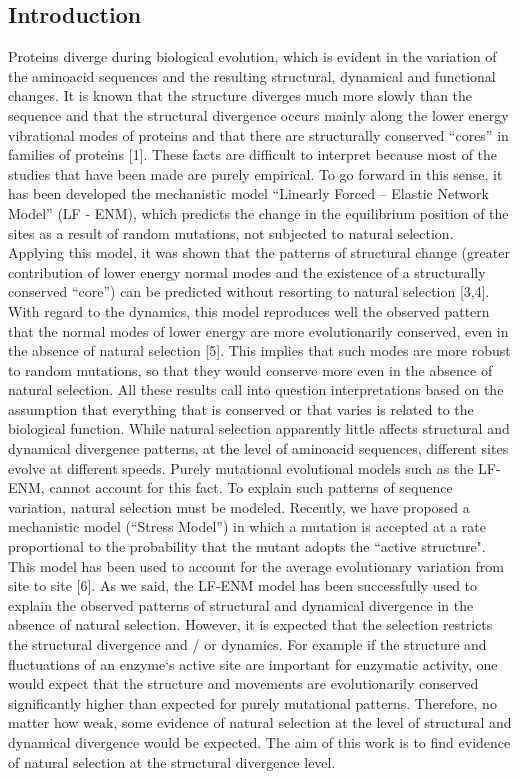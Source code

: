 \documentclass{article}
\begin{document}
\begin{multicols}{2} 
\section{Introduction}
Proteins diverge during biological evolution, which is evident in the variation of the aminoacid sequences and the resulting structural, dynamical and functional changes. It is known that the structure diverges much more slowly than the sequence and that the  structural divergence occurs mainly along the lower energy vibrational modes of proteins and that there are structurally conserved ``cores'' in families of proteins [1]. These facts are difficult to interpret because most of the studies that have been made are purely empirical. To go forward in this sense, it has been developed the mechanistic model ``Linearly Forced – Elastic Network Model'' (LF - ENM), which predicts the change in the equilibrium position of the sites as a result of random mutations, not subjected to natural selection. Applying this model, it was shown that the patterns of structural change (greater contribution of lower energy normal modes and the existence of a structurally conserved ``core'') can be predicted without resorting to natural selection [3,4]. With regard to the dynamics, this model reproduces well the observed pattern that the normal modes of lower energy are more evolutionarily conserved, even in the absence of natural selection [5]. This implies that such modes are more robust to random mutations, so that they would conserve more even in the absence of natural selection. All these results call into question interpretations based on the assumption that everything that is conserved or that varies is related to the biological function.
While natural selection apparently little affects structural and dynamical divergence patterns, at the level of aminoacid sequences, different sites evolve at different speeds. Purely mutational evolutional models such as the LF-ENM, cannot account for this fact. To explain such patterns of sequence variation, natural selection must be modeled. Recently, we have proposed a mechanistic model (``Stress Model'') in which a mutation is accepted at a rate proportional to the probability that the mutant adopts the ``active structure". This model has been used to account for the average evolutionary variation from site to site [6].
As we said, the LF-ENM model has been successfully used to explain the observed patterns of structural and dynamical divergence in the absence of natural selection. However, it is expected that the selection restricts the structural divergence and / or dynamics. For example if the structure and fluctuations of an enzyme`s active site are important for enzymatic activity, one would expect that the structure and movements are evolutionarily conserved significantly higher than expected for purely mutational patterns. Therefore, no matter how weak, some evidence of natural selection at the level of structural and dynamical divergence would be expected. The aim of this work is to find evidence of natural selection at the structural divergence level.


\end{multicols}
\end{document}
